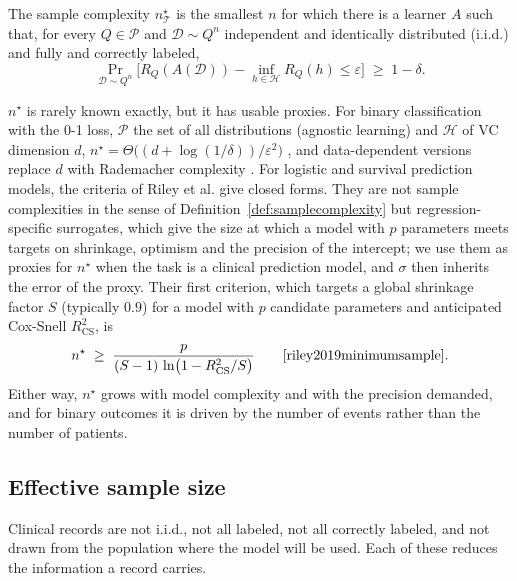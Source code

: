 \documentclass[acmsmall,screen,review]{acmart}
\theoremstyle{acmdefinition}
\begin{document}
\begin{definition}\label{def:samplecomplexity}
The sample complexity $n^{\star}_{\mathcal{T}}$ is the smallest $n$ for which there is a learner $A$ such that, for every $Q\in\mathcal{P}$ and $\mathcal{D}\sim Q^n$ independent and identically distributed (i.i.d.) and fully and correctly labeled,
\[
\Pr_{\mathcal{D}\sim Q^n} \Big[R_Q(A(\mathcal{D})) - \inf_{h\in\mathcal{H}} R_Q(h) \le \varepsilon\Big] \;\ge\; 1-\delta.
\]
\end{definition}

$n^{\star}$ is rarely known exactly, but it has usable proxies. For binary classification with the 0-1 loss, $\mathcal{P}$ the set of all distributions (agnostic learning) and $\mathcal{H}$ of VC dimension $d$, $n^{\star}=\Theta\bigl((d+\log(1/\delta))/\varepsilon^2\bigr)$ \cite{shalevshwartz2014understanding}, and data-dependent versions replace $d$ with Rademacher complexity \cite{bartlett2002rademacher}. For logistic and survival prediction models, the criteria of Riley et al. give closed forms. They are not sample complexities in the sense of Definition~\ref{def:samplecomplexity} but regression-specific surrogates, which give the size at which a model with $p$ parameters meets targets on shrinkage, optimism and the precision of the intercept; we use them as proxies for $n^{\star}$ when the task is a clinical prediction model, and $\sigma$ then inherits the error of the proxy. Their first criterion, which targets a global shrinkage factor $S$ (typically $0.9$) for a model with $p$ candidate parameters and anticipated Cox-Snell $R^2_{\mathrm{CS}}$, is
\begin{equation}\label{eq:riley}
n^{\star} \;\ge\; \frac{p}{(S-1)\,\ln\bigl(1-R^2_{\mathrm{CS}}/S\bigr)} \qquad \text{\cite{riley2019minimumsample}.}
\end{equation}
Either way, $n^{\star}$ grows with model complexity and with the precision demanded, and for binary outcomes it is driven by the number of events rather than the number of patients.

\subsection{Effective sample size}

Clinical records are not i.i.d., not all labeled, not all correctly labeled, and not drawn from the population where the model will be used. Each of these reduces the information a record carries.
\end{document}
